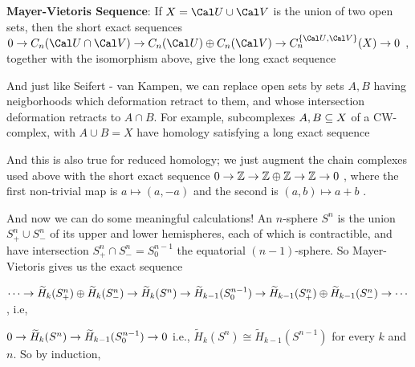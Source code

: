 \msk

{\bf Mayer-Vietoris Sequence}: If $X={\Cal U}\cup{\Cal V}$ is the union of two open sets, then
the short exact sequences \hhsk 
$0\ra C_n({\Cal U}\cap {\Cal V}) \ra C_n({\Cal U})\oplus C_n({\Cal V}) \ra C_n^{\{ {\Cal U},{\Cal V}\}}(X)\ra 0$
\hhsk , together with the isomorphism above, give the long exact sequence


\msk

And just like Seifert - van Kampen, we can replace open sets by sets $A,B$ having neigborhoods which deformation
retract to them, and whose intersection deformation retracts to $A\cap B$. For example,
subcomplexes $A,B\subseteq X$ of a CW-complex, with $A\cup B = X$ have homology satisfying a long
exact sequence

\ssk


\ssk

And this is also true for reduced homology; we just augment the chain complexes used above with the 
short exact sequence \hhsk $0\rightarrow {\Bbb Z}\rightarrow {\Bbb Z}\oplus {\Bbb Z} \rightarrow {\Bbb Z} \rightarrow 0$ , 
where the first non-trivial map is $a\mapsto (a,-a)$ and the second is $(a,b)\mapsto a+b$ .

\msk

And now we can do some meaningful calculations!  An $n$-sphere $S^n$
is the union $S^n_+\cup S^n_-$ of its upper and lower hemispheres, each of which 
is contractible, and have intersection $S^n_+\cap S^n_-=S^{n-1}_0$ the equatorial
$(n-1)$-sphere. So Mayer-Vietoris gives us the exact sequence

\hhsk $\cdots \rightarrow \widetilde{H}_k(S^n_+)\oplus \widetilde{H}_k(S^n_-) \rightarrow \widetilde{H}_k(S^n)
\rightarrow \widetilde{H}_{k-1}(S^{n-1}_0) \rightarrow \widetilde{H}_{k-1}(S^n_+)\oplus \widetilde{H}_{k-1}(S^n_-)\rightarrow \cdots$ 
\hhsk , i.e, \hhsk

$0 \rightarrow \widetilde{H}_k(S^n)\rightarrow \widetilde{H}_{k-1}(S^{n-1}_0) \rightarrow  0$ \hhsk 
i.e., $\widetilde{H}_k(S^n)\cong \widetilde{H}_{k-1}(S^{n-1})$ for every $k$ and $n$. 
So by induction, 

